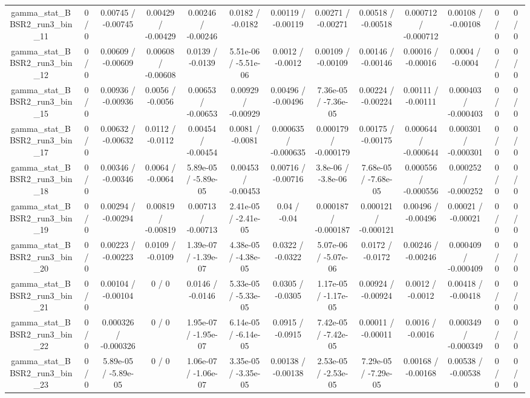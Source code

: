 \documentclass[10pt]{article}
\begin{document}
\begin{table}[htbp]
\begin{center}
\begin{tabular}{|c|c|c|c|c|c|c|c|c|c|c|c|c|}
  gamma_stat_BBSR2_run3_bin_11 & 0 / 0 & 0.00745 / -0.00745 & 0.00429 / -0.00429 & 0.00246 / -0.00246 & 0.0182 / -0.0182 & 0.00119 / -0.00119 & 0.00271 / -0.00271 & 0.00518 / -0.00518 & 0.000712 / -0.000712 & 0.00108 / -0.00108 & 0 / 0 & 0 / 0 \\ 
  gamma_stat_BBSR2_run3_bin_12 & 0 / 0 & 0.00609 / -0.00609 & 0.00608 / -0.00608 & 0.0139 / -0.0139 & 5.51e-06 / -5.51e-06 & 0.0012 / -0.0012 & 0.00109 / -0.00109 & 0.00146 / -0.00146 & 0.00016 / -0.00016 & 0.0004 / -0.0004 & 0 / 0 & 0 / 0 \\ 
  gamma_stat_BBSR2_run3_bin_15 & 0 / 0 & 0.00936 / -0.00936 & 0.0056 / -0.0056 & 0.00653 / -0.00653 & 0.00929 / -0.00929 & 0.00496 / -0.00496 & 7.36e-05 / -7.36e-05 & 0.00224 / -0.00224 & 0.00111 / -0.00111 & 0.000403 / -0.000403 & 0 / 0 & 0 / 0 \\ 
  gamma_stat_BBSR2_run3_bin_17 & 0 / 0 & 0.00632 / -0.00632 & 0.0112 / -0.0112 & 0.00454 / -0.00454 & 0.0081 / -0.0081 & 0.000635 / -0.000635 & 0.000179 / -0.000179 & 0.00175 / -0.00175 & 0.000644 / -0.000644 & 0.000301 / -0.000301 & 0 / 0 & 0 / 0 \\ 
  gamma_stat_BBSR2_run3_bin_18 & 0 / 0 & 0.00346 / -0.00346 & 0.0064 / -0.0064 & 5.89e-05 / -5.89e-05 & 0.00453 / -0.00453 & 0.00716 / -0.00716 & 3.8e-06 / -3.8e-06 & 7.68e-05 / -7.68e-05 & 0.000556 / -0.000556 & 0.000252 / -0.000252 & 0 / 0 & 0 / 0 \\ 
  gamma_stat_BBSR2_run3_bin_19 & 0 / 0 & 0.00294 / -0.00294 & 0.00819 / -0.00819 & 0.00713 / -0.00713 & 2.41e-05 / -2.41e-05 & 0.04 / -0.04 & 0.000187 / -0.000187 & 0.000121 / -0.000121 & 0.00496 / -0.00496 & 0.00021 / -0.00021 & 0 / 0 & 0 / 0 \\ 
  gamma_stat_BBSR2_run3_bin_20 & 0 / 0 & 0.00223 / -0.00223 & 0.0109 / -0.0109 & 1.39e-07 / -1.39e-07 & 4.38e-05 / -4.38e-05 & 0.0322 / -0.0322 & 5.07e-06 / -5.07e-06 & 0.0172 / -0.0172 & 0.00246 / -0.00246 & 0.000409 / -0.000409 & 0 / 0 & 0 / 0 \\ 
  gamma_stat_BBSR2_run3_bin_21 & 0 / 0 & 0.00104 / -0.00104 & 0 / 0 & 0.0146 / -0.0146 & 5.33e-05 / -5.33e-05 & 0.0305 / -0.0305 & 1.17e-05 / -1.17e-05 & 0.00924 / -0.00924 & 0.0012 / -0.0012 & 0.00418 / -0.00418 & 0 / 0 & 0 / 0 \\ 
  gamma_stat_BBSR2_run3_bin_22 & 0 / 0 & 0.000326 / -0.000326 & 0 / 0 & 1.95e-07 / -1.95e-07 & 6.14e-05 / -6.14e-05 & 0.0915 / -0.0915 & 7.42e-05 / -7.42e-05 & 0.00011 / -0.00011 & 0.0016 / -0.0016 & 0.000349 / -0.000349 & 0 / 0 & 0 / 0 \\ 
  gamma_stat_BBSR2_run3_bin_23 & 0 / 0 & 5.89e-05 / -5.89e-05 & 0 / 0 & 1.06e-07 / -1.06e-07 & 3.35e-05 / -3.35e-05 & 0.00138 / -0.00138 & 2.53e-05 / -2.53e-05 & 7.29e-05 / -7.29e-05 & 0.00168 / -0.00168 & 0.00538 / -0.00538 & 0 / 0 & 0 / 0 \\ 

\end{tabular}
\end{center}
\end{table}
\end{document}

